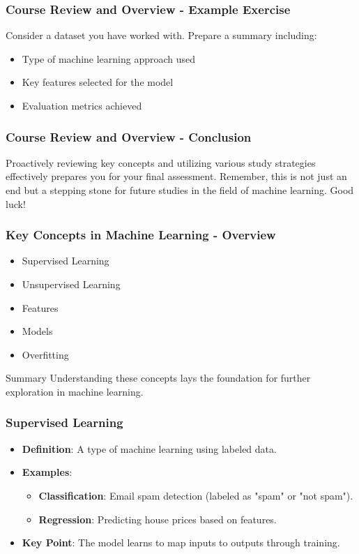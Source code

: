 \documentclass[aspectratio=169]{beamer}
\begin{document}
\begin{frame}[fragile]
    \frametitle{Course Review and Overview - Example Exercise}
    Consider a dataset you have worked with. Prepare a summary including:
    \begin{itemize}
        \item Type of machine learning approach used
        \item Key features selected for the model
        \item Evaluation metrics achieved
    \end{itemize}
\end{frame}

\begin{frame}[fragile]
    \frametitle{Course Review and Overview - Conclusion}
    Proactively reviewing key concepts and utilizing various study strategies effectively prepares you for your final assessment. Remember, this is not just an end but a stepping stone for future studies in the field of machine learning. Good luck!
\end{frame}

\begin{frame}[fragile]
    \frametitle{Key Concepts in Machine Learning - Overview}
    \begin{itemize}
        \item Supervised Learning
        \item Unsupervised Learning
        \item Features
        \item Models
        \item Overfitting
    \end{itemize}
    \begin{block}{Summary}
        Understanding these concepts lays the foundation for further exploration in machine learning.
    \end{block}
\end{frame}

\begin{frame}[fragile]
    \frametitle{Supervised Learning}
    \begin{itemize}
        \item \textbf{Definition}: 
            A type of machine learning using labeled data.
        \item \textbf{Examples}: 
            \begin{itemize}
                \item \textbf{Classification}: Email spam detection (labeled as "spam" or "not spam").
                \item \textbf{Regression}: Predicting house prices based on features.
            \end{itemize}
        \item \textbf{Key Point}: 
            The model learns to map inputs to outputs through training.
    \end{itemize}
\end{frame}
\end{document}
